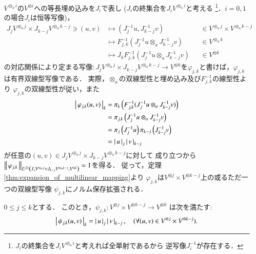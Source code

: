 	
	$V^{\otimes_a i}$の$V^{\otimes i}$への等長埋め込みを$J_i$で表し
	($J_i$の終集合を$J_i V^{\otimes_a i}$と考える
	\footnote{
		$J_i$の終集合を$J_i V^{\otimes_a i}$と考えれば全単射であるから
		逆写像$J_i^{-1}$が存在する．
	}．$i=0,1$の場合$J_i$は恒等写像)，
	\begin{align}
		J_j V^{\otimes_a j} \times J_{k-j} V^{\otimes_a k-j} \ni (u,v)
		& \longmapsto ( J_j^{-1}u,J_{k-j}^{-1}v ) &&\in V^{\otimes_a j} \times V^{\otimes_a k-j} \\
		& \longmapsto F_{j,k}^{-1} (J_j^{-1}u \otimes_a J_{k-j}^{-1}v) &&\in V^{\otimes_a k} \\
		& \longmapsto J_k F_{j,k}^{-1} (J_j^{-1}u \otimes_a J_{k-j}^{-1}v) &&\in V^{\otimes k}
		\label{bilinear_map_on_algebraic_Banach_tensor_products}
	\end{align}
	の対応関係により定まる写像$:J_j V^{\otimes_a j} \times J_{k-j} V^{\otimes_a k-j}
	\longrightarrow V^{\otimes k}$を$\varphi_{j,k}$と書けば，$\varphi_{j,k}$は有界双線型写像である．
	実際，$\otimes_a$の双線型性と埋め込み及び$F_{j,k}^{-1}$の線型性より
	$\varphi_{j,k}$の双線型性が従い，また
	\begin{align}
		\compcrossnorm{\varphi_{j,k}(u,v)}{k}
		&= \projectivenorm{F_{j,k}^{-1} (J_j^{-1}u \otimes_a J_{k-j}^{-1}v)}{k} \\
		&= \projectivenorm{J_j^{-1}u \otimes_a J_{k-j}^{-1}v}{j,k} \\
		&= \projectivenorm{J_j^{-1}u}{j} \projectivenorm{J_{k-j}^{-1}v}{k-j} \\
		&= \compcrossnorm{u}{j} \compcrossnorm{v}{k-j}
	\end{align}
	が任意の$(u,v) \in J_j V^{\otimes_a j} \times J_{k-j} V^{\otimes_a k-j}$に対して
	成り立つから$\Norm{\varphi_{j,k}}{\ContLn{J_j V^{\otimes_a j} \times J_{k-j} V^{\otimes_a k-j}}{V^{\otimes k}}{2}} = 1$を得る．
	従って，定理\ref{thm:expansion_of_multilinear_mapping}より
	$\varphi_{j,k}$は$V^{\otimes j} \times V^{\otimes k-j}$上の或るただ一つの双線型写像
	$\psi_{j,k}$にノルム保存拡張される．
	
	\begin{screen}
		\begin{thm}\label{thm:property_of_the_completion_of_the_projective_norm}
			$0 \leq j \leq k$とする．
			このとき，$\psi_{j,k}:V^{\otimes j} \times V^{\otimes k-j} \longrightarrow V^{\otimes k}$
			は次を満たす:
			\begin{align}
				\compcrossnorm{\psi_{j,k}(u,v)}{k} = \compcrossnorm{u}{j} \compcrossnorm{v}{k-j},
				\quad (\forall (u,v) \in V^{\otimes j} \times V^{\otimes k-j}).
			\end{align}
		\end{thm}
	\end{screen}
	
